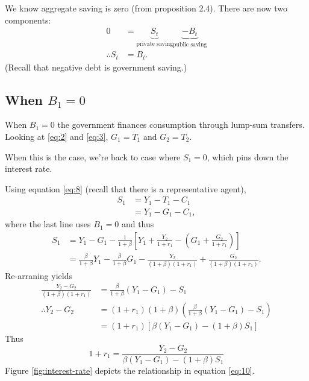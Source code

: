 \documentclass[12pt]{pracjourn_rwr}
\theoremstyle{remark}
\begin{document}
We know aggregate saving is zero (from proposition 2.4).
There are now two components:
\begin{align*}
0 &= \underbrace{S_{t}}_{\text{private saving}} \underbrace{- B_{t}}_{\text{public saving}} \\
\therefore S_{t} &= B_{t}.
\end{align*}
(Recall that negative debt is government saving.)

\subsection{When $B_{1} =0$}

When $B_{1} = 0$ the government finances consumption through lump-sum transfers.
Looking at \eqref{eq:2} and \eqref{eq:3}, $G_{1} = T_{1}$ and $G_{2} = T_{2}$.

When this is the case, we're back to case where $S_{1} = 0$,
which pins down the interest rate.

Using equation \eqref{eq:8} (recall that there is a representative agent),
\begin{align*}
S_{1} &= Y_{1} - T_{1} - C_{1} \\
&= Y_{1} - G_{1} - C_{1},
\end{align*}
where the last line uses $B_{1} = 0$ and thus
\begin{align*}
S_{1} &= Y_{1} - G_{1} - \frac{1}{1+\beta} \left[ Y_{1} + \frac{Y_{2}}{1+r_{1}} - \left( G_{1} + \frac{G_{2}}{1+r_{1}} \right) \right] \\
&= \frac{\beta}{1+\beta}Y_{1} - \frac{\beta}{1+\beta} G_{1} - \frac{Y_{2}}{(1+\beta)(1+r_{1})} + \frac{G_{2}}{(1+\beta)(1+r_{1})}.
\end{align*}
Re-arraning yields
\begin{align*}
\frac{Y_{2}-G_{2}}{(1+\beta)(1+r_{1})} &= \frac{\beta}{1+\beta} \left( Y_{1}-G_{1} \right) - S_{1} \\
\therefore Y_{2}-G_{2} &= (1+r_{1}) (1+\beta) \left( \frac{\beta}{1+\beta} \left( Y_{1}-G_{1} \right) - S_{1} \right) \\
&= (1+r_{1}) \left[ \beta \left( Y_{1}-G_{1} \right) - (1+\beta)S_{1} \right]
\end{align*}
Thus
\begin{equation}
\label{eq:10}
1+r_{1} = \frac{Y_{2}-G_{2}}{\beta \left( Y_{1}-G_{1} \right) - (1+\beta)S_{1}}
\end{equation}
Figure \ref{fig:interest-rate} depicts the relationship in equation \eqref{eq:10}.
\end{document}
